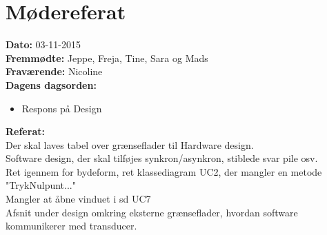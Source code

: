 \chapter{Mødereferat}

\textbf{Dato:} 03-11-2015\\

\textbf{Fremmødte:} Jeppe, Freja, Tine, Sara og Mads\\

\textbf{Fraværende:} Nicoline\\

\textbf{Dagens dagsorden:}
\begin{itemize}
	\item Respons på Design
\end{itemize}

\textbf{Referat:}\\
Der skal laves tabel over grænseflader til Hardware design.\\
Software design, der skal tilføjes synkron/asynkron, stiblede svar pile osv. \\
Ret igennem for bydeform, ret klassediagram UC2, der mangler en metode "TrykNulpunt..."\\
Mangler at åbne vinduet i sd UC7\\
Afsnit under design omkring eksterne grænseflader, hvordan software kommunikerer med transducer.\\
